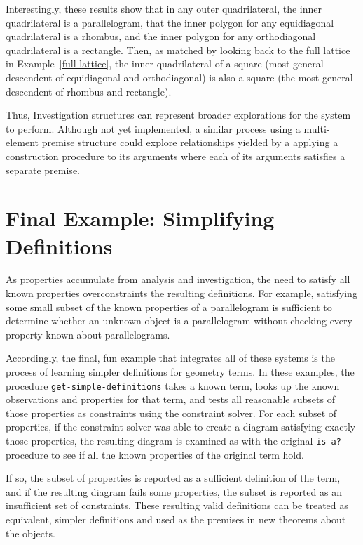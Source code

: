 Interestingly, these results show that in any outer
quadrilateral, the inner quadrilateral is a parallelogram, that the
inner polygon for any equidiagonal quadrilateral is a rhombus, and the
inner polygon for any orthodiagonal quadrilateral is a
rectangle. Then, as matched by looking back to the full lattice in
Example~\ref{full-lattice}, the inner quadrilateral of a square (most
general descendent of equidiagonal and orthodiagonal) is also a square
(the most general descendent of rhombus and rectangle).

Thus, Investigation structures can represent broader explorations for the
system to perform.  Although not yet implemented, a similar process
using a multi-element premise structure could explore relationships
yielded by a applying a construction procedure to its arguments where
each of its arguments satisfies a separate premise.

\section{Final Example: Simplifying Definitions}

As properties accumulate from analysis and investigation, the
need to satisfy all known properties overconstraints the resulting
definitions. For example, satisfying some small subset of the known
properties of a parallelogram is sufficient to determine whether an
unknown object is a parallelogram without checking every property
known about parallelograms.

Accordingly, the final, fun example that integrates all of these
systems is the process of learning simpler definitions for geometry
terms. In these examples, the procedure
\texttt{get-simple-definitions} takes a known term, looks up the known
observations and properties for that term, and tests all reasonable
subsets of those properties as constraints using the constraint
solver. For each subset of properties, if the constraint solver was
able to create a diagram satisfying exactly those properties, the
resulting diagram is examined as with the original \texttt{is-a?}
procedure to see if all the known properties of the original term
hold.

If so, the subset of properties is reported as a sufficient definition
of the term, and if the resulting diagram fails some properties, the
subset is reported as an insufficient set of constraints. These
resulting valid definitions can be treated as equivalent, simpler
definitions and used as the premises in new theorems about the
objects.

